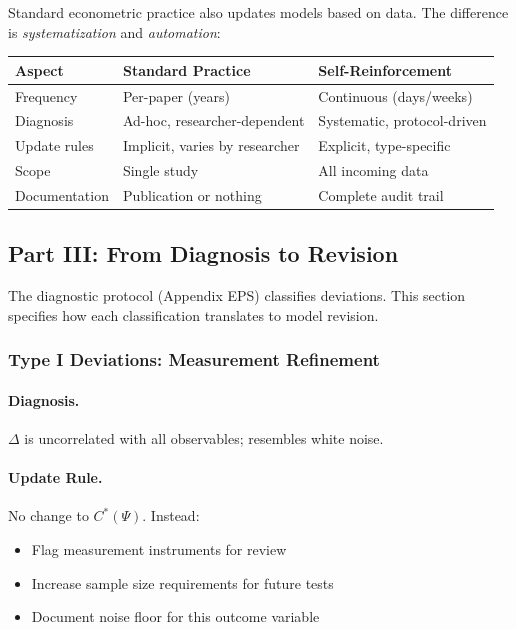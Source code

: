 Standard econometric practice also updates models based on data. The difference 
is \emph{systematization} and \emph{automation}:

\begin{center}
\renewcommand{\arraystretch}{1.3}
\begin{tabular}{|l|p{5cm}|p{5cm}|}
\hline
\textbf{Aspect} & \textbf{Standard Practice} & \textbf{Self-Reinforcement} \\
\hline
Frequency & Per-paper (years) & Continuous (days/weeks) \\
Diagnosis & Ad-hoc, researcher-dependent & Systematic, protocol-driven \\
Update rules & Implicit, varies by researcher & Explicit, type-specific \\
Scope & Single study & All incoming data \\
Documentation & Publication or nothing & Complete audit trail \\
\hline
\end{tabular}
\end{center}

\subsection{Part III: From Diagnosis to Revision}

The diagnostic protocol (Appendix EPS) classifies deviations. This section 
specifies how each classification translates to model revision.

\subsubsection{Type I Deviations: Measurement Refinement}

\paragraph{Diagnosis.}
$\Delta$ is uncorrelated with all observables; resembles white noise.

\paragraph{Update Rule.}
No change to $C^*(\Psi)$. Instead:
\begin{itemize}
    \item Flag measurement instruments for review
    \item Increase sample size requirements for future tests
    \item Document noise floor for this outcome variable
\end{itemize}

